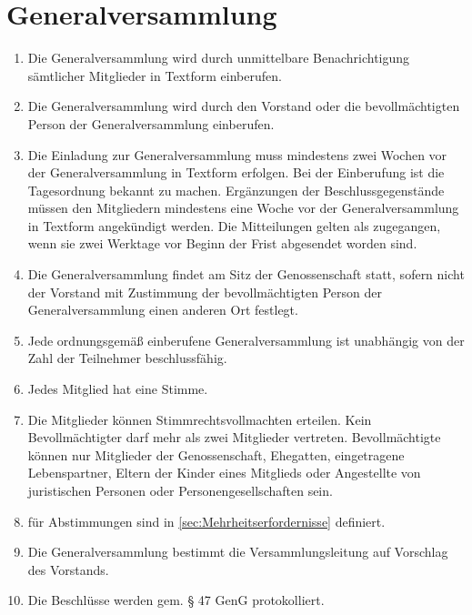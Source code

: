 \documentclass[a4paper, 12pt]{scrartcl}
\begin{document}
\section{Generalversammlung}
\begin{enumerate}
  \item Die Generalversammlung wird durch unmittelbare Benachrichtigung sämtlicher Mitglieder in Textform einberufen.
  \item Die Generalversammlung wird durch den Vorstand oder die bevollmächtigten Person der Generalversammlung einberufen.
  \item Die Einladung zur Generalversammlung muss mindestens zwei Wochen vor der Generalversammlung in Textform erfolgen. Bei der Einberufung ist die Tagesordnung bekannt zu machen. Ergänzungen der Beschlussgegenstände müssen den Mitgliedern mindestens eine Woche vor der Generalversammlung in Textform angekündigt werden. Die Mitteilungen gelten als zugegangen, wenn sie zwei Werktage vor Beginn der Frist abgesendet worden sind.
  \item Die Generalversammlung findet am Sitz der Genossenschaft statt, sofern nicht der Vorstand mit Zustimmung der bevollmächtigten Person der Generalversammlung einen anderen Ort festlegt.
  \item Jede ordnungsgemäß einberufene Generalversammlung ist unabhängig von der Zahl der Teilnehmer beschlussfähig.
  \item Jedes Mitglied hat eine Stimme.
  \item Die Mitglieder können Stimmrechtsvollmachten erteilen. Kein Bevollmächtigter darf mehr als zwei Mitglieder vertreten. Bevollmächtigte können nur Mitglieder der Genossenschaft, Ehegatten, eingetragene Lebenspartner, Eltern der Kinder eines Mitglieds oder Angestellte von juristischen Personen oder Personengesellschaften sein.
  \item {} für Abstimmungen sind in \ref{sec:Mehrheitserfordernisse} definiert.
  \item Die Generalversammlung bestimmt die Versammlungsleitung auf Vorschlag des Vorstands.
  \item Die Beschlüsse werden gem. § 47 GenG protokolliert.
\end{enumerate}
\end{document}
